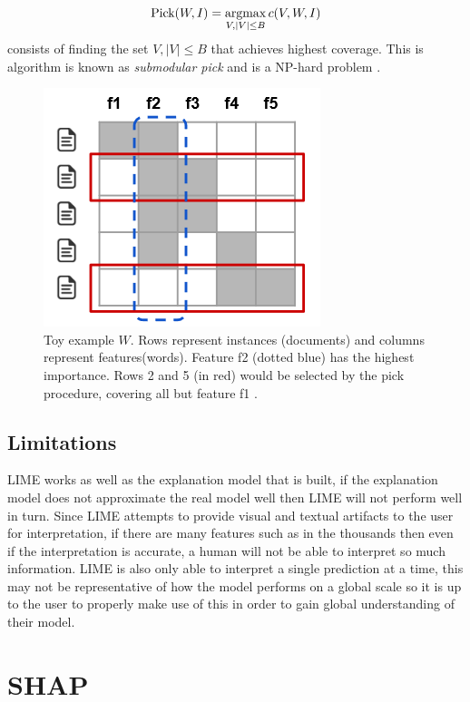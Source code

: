 \begin{equation}
   \mbox{Pick}(W,I) = \operatorname*{argmax}_{V,|V|\leq B} c(V,W,I)
\end{equation}
consists of finding the set $V ,|V| \leq B$ that achieves highest coverage. This is algorithm is known as \emph{submodular pick} and is a NP-hard problem \cite{10.1145/285055.285059}.
\begin  {figure}[!htpb]
\centering
  \includegraphics[width=0.5\linewidth]{Evaluation_Images/SP-LIME-Example.png}
  \caption{Toy  example $W$. Rows  represent  instances (documents) and columns represent features(words).  Feature f2 (dotted blue) has the highest importance.  Rows 2 and 5 (in red) would be selected by the pick procedure, covering all but feature f1 \cite{lime}.}
  \label{fig:sp-lime-example}
\end{figure}


\subsection{Limitations} LIME works as well as the explanation model that is built, if the explanation model does not approximate the real model well then LIME will not perform well in turn. Since LIME attempts to provide visual and textual artifacts to the user for interpretation, if there are many features such as in the thousands then even if the interpretation is accurate, a human will not be able to interpret so much information. LIME is also only able to interpret a single prediction at a time, this may not be representative of how the model performs on a global scale so it is up to the user to properly make use of this in order to gain global understanding of their model.


\section{SHAP}

